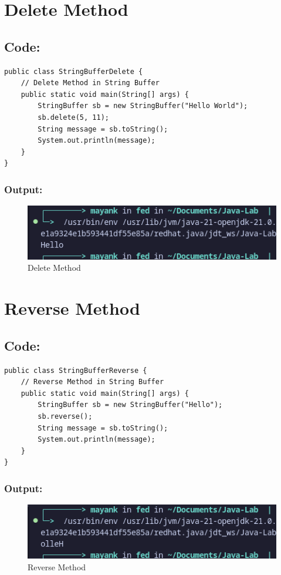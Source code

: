 \documentclass[a4paper,12pt]{article}
\begin{document}
\section{Delete Method}
\subsection{Code:}
\begin{lstlisting}
public class StringBufferDelete {
    // Delete Method in String Buffer
    public static void main(String[] args) {
        StringBuffer sb = new StringBuffer("Hello World");
        sb.delete(5, 11);
        String message = sb.toString();
        System.out.println(message);
    }
}
\end{lstlisting}
\subsubsection{Output:}
\begin{figure}[H]
    \centering
    \includegraphics[width=0.8\linewidth]{images/DElete.png}
    \caption{Delete Method}
\end{figure}

\section{Reverse Method}
\subsection{Code:}
\begin{lstlisting}
public class StringBufferReverse {
    // Reverse Method in String Buffer
    public static void main(String[] args) {
        StringBuffer sb = new StringBuffer("Hello");
        sb.reverse();
        String message = sb.toString();
        System.out.println(message);
    }
}
\end{lstlisting}
\subsubsection{Output:}
\begin{figure}[H]
    \centering
    \includegraphics[width=0.8\linewidth]{images/reverse.png}
    \caption{Reverse Method}
\end{figure}
\end{document}
